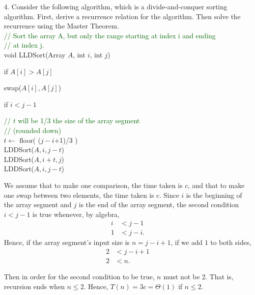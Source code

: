 \documentclass{article}
\begin{document}
4. Consider the following algorithm, which is a divide-and-conquer sorting algorithm. First, derive a recurrence relation for the algorithm. Then solve the recurrence using the Master Theorem.\\

\textcolor{darkgreen}{// Sort the array A, but only the range starting at index i and ending}\\
\textcolor{darkgreen}{// at index j.}\\
void LLDSort(Array $A$, int $i$, int $j$)
\begin{adjustwidth}{2.5em}{0pt}
if $A[i] > A[j]$
\end{adjustwidth}
\begin{adjustwidth}{5.0em}{0pt}
swap($A[i], A[j]$)
\end{adjustwidth}
\begin{adjustwidth}{2.5em}{0pt}
if $i < j-1$
\end{adjustwidth}
\begin{adjustwidth}{5.0em}{0pt}
\textcolor{darkgreen}{// $t$ will be 1/3 the size of the array segment}\\
\textcolor{darkgreen}{// (rounded down)}\\
$t \leftarrow$ floor( ($j-i$+1)/3 )\\
LDDSort($A, i, j-t$)\\
LDDSort($A, i+t, j$)\\
LDDSort($A, i, j-t$)
\end{adjustwidth}

We assume that to make one comparison, the time taken is $c$, and that to make one swap between two elements, the time taken is $c$. Since $i$ is the beginning of the array segment and $j$ is the end of the array segment, the second condition $i < j - 1$ is true whenever, by algebra,
\begin{align*}
i &< j - 1\\
1 &< j - i.
\end{align*}
Hence, if the array segment's input size is $n = j - i + 1$, if we add $1$ to both sides,
\begin{align*}
2 &< j - i + 1\\
2 &< n.
\end{align*}

Then in order for the second condition to be true, $n$ must not be 2. That is, recursion ends when $n \leq 2$. Hence, $T(n) = 3c = \Theta(1)$ if $n \leq 2$.\\
\end{document}

